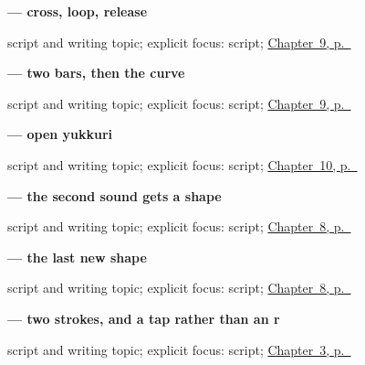 \noindent\begin{minipage}[t]{\linewidth}
\raggedright
\textbf{ — cross, loop, release}\par
\footnotesize script and writing topic; explicit focus: script; \hyperref[ch:ja-repeat-please]{Chapter~9, p.~\pageref*{ch:ja-repeat-please}}
\end{minipage}\par\smallskip

\noindent\begin{minipage}[t]{\linewidth}
\raggedright
\textbf{ — two bars, then the curve}\par
\footnotesize script and writing topic; explicit focus: script; \hyperref[ch:ja-repeat-please]{Chapter~9, p.~\pageref*{ch:ja-repeat-please}}
\end{minipage}\par\smallskip

\noindent\begin{minipage}[t]{\linewidth}
\raggedright
\textbf{ — open yukkuri}\par
\footnotesize script and writing topic; explicit focus: script; \hyperref[ch:ja-slower-please]{Chapter~10, p.~\pageref*{ch:ja-slower-please}}
\end{minipage}\par\smallskip

\noindent\begin{minipage}[t]{\linewidth}
\raggedright
\textbf{ — the second sound gets a shape}\par
\footnotesize script and writing topic; explicit focus: script; \hyperref[ch:ja-sayounara]{Chapter~8, p.~\pageref*{ch:ja-sayounara}}
\end{minipage}\par\smallskip

\noindent\begin{minipage}[t]{\linewidth}
\raggedright
\textbf{ — the last new shape}\par
\footnotesize script and writing topic; explicit focus: script; \hyperref[ch:ja-sayounara]{Chapter~8, p.~\pageref*{ch:ja-sayounara}}
\end{minipage}\par\smallskip

\noindent\begin{minipage}[t]{\linewidth}
\raggedright
\textbf{ — two strokes, and a tap rather than an r}\par
\footnotesize script and writing topic; explicit focus: script; \hyperref[ch:ja-plain-thanks]{Chapter~3, p.~\pageref*{ch:ja-plain-thanks}}
\end{minipage}\par\smallskip

